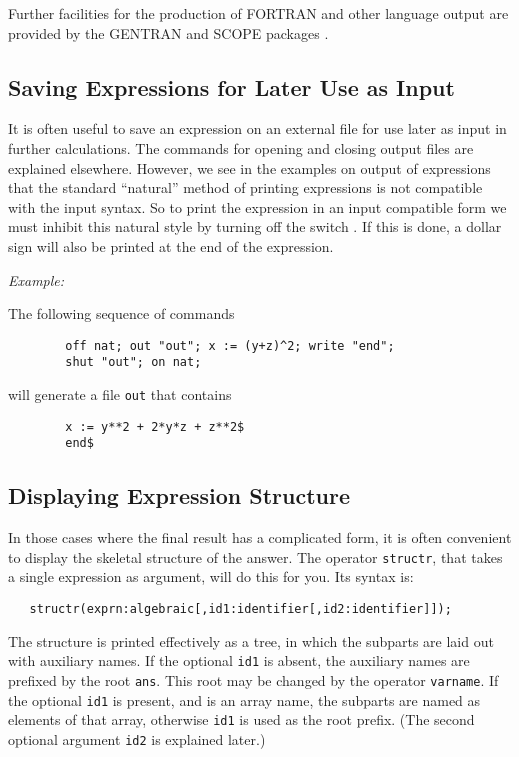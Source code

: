 Further facilities for the production of FORTRAN and other language output
are provided by the GENTRAN and SCOPE packages
.

\subsection{Saving Expressions for Later Use as Input}
\hypertarget{switch:NAT}{}

It is often useful to save an expression on an external file for use later
as input in further calculations. The commands for opening and closing
output files are explained elsewhere. However, we see in the examples on
output of expressions that the standard ``natural'' method of printing
expressions is not compatible with the input syntax. So to print the
expression in an input compatible form we must inhibit this natural style
by turning off the switch . If this is done, a
dollar sign will also be printed at the end of the expression.

\textit{Example:}

The following sequence of commands
\begin{verbatim}
        off nat; out "out"; x := (y+z)^2; write "end";
        shut "out"; on nat;
\end{verbatim}
will generate a file \texttt{out} that contains
\begin{verbatim}
        x := y**2 + 2*y*z + z**2$
        end$
\end{verbatim}

\subsection{Displaying Expression Structure}
\hypertarget{operator:STRUCTR}{}

In those cases where the final result has a complicated form, it is often
convenient to display the skeletal structure of the answer.  The operator
\texttt{structr}, that takes a single expression as argument,
will do this for you.  Its syntax is:
\begin{verbatim}
   structr(exprn:algebraic[,id1:identifier[,id2:identifier]]);
\end{verbatim}
The structure is printed effectively as a tree, in which the subparts are
laid out with auxiliary names.  If the optional \texttt{id1} is absent, the
auxiliary names are prefixed by the root \texttt{ans}.  This root may be
changed by the operator \texttt{varname}.  If the
optional \texttt{id1} is present, and is an array name, the subparts are
named as elements of that array, otherwise \texttt{id1} is used as the root
prefix. (The second optional argument \texttt{id2} is explained later.)

